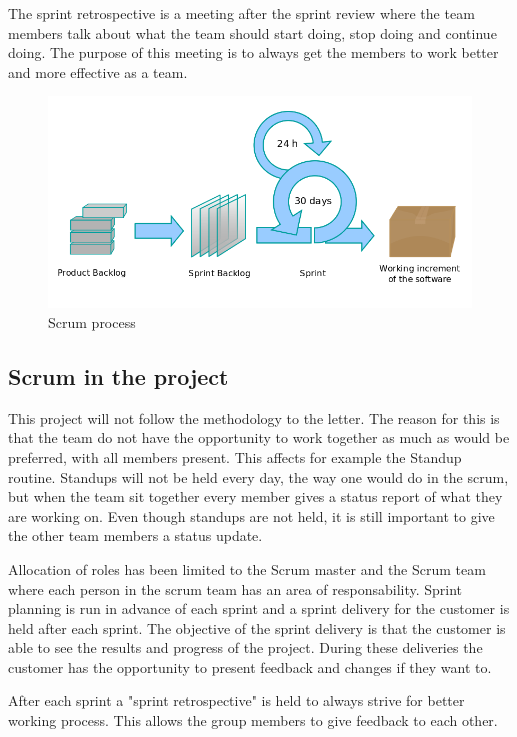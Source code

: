 The sprint retrospective is a meeting after the sprint review where the team members talk about what 
the team should start doing, stop doing and continue doing. The purpose of this meeting is to always 
get the members to work better and more effective as a team. \cite{wikiAgile}

\begin{figure}[!ht]
    \includegraphics[scale=0.4]{pictures/Scrumprocess.png}
    \caption{Scrum process}
\end{figure}

\subsection*{Scrum in the project}

This project will not follow the methodology to the letter. The reason for this is that the team do 
not have the opportunity to work together as much as would be preferred, with all members present. This affects
for example the Standup routine. Standups will not be held every day, the way one would do in the scrum,
but when the team sit together every member gives a status report of what they are working on. Even though standups are not held, it is still important to give the other team members a status update.

Allocation of roles has been limited to the Scrum master and the Scrum team where each person in the scrum team has an area of responsability. Sprint planning is run in advance of each sprint and a sprint delivery for the customer 
is held after each sprint. The objective of the sprint delivery is that the customer is able to see the results and progress of the project. During these deliveries the customer has the opportunity to present feedback and changes 
if they want to.

After each sprint a "sprint retrospective" is held to always strive for better working 
process. This allows the group members to give feedback to each other.

